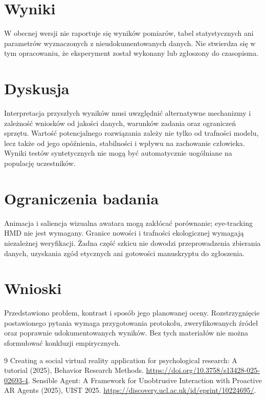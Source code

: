 \documentclass[11pt,a4paper]{article}
\begin{document}
\section{Wyniki}

W obecnej wersji nie raportuje się wyników pomiarów, tabel statystycznych ani parametrów wyznaczonych z nieudokumentowanych danych. Nie stwierdza się w tym opracowaniu, że eksperyment został wykonany lub zgłoszony do czasopisma.

\section{Dyskusja}

Interpretacja przyszłych wyników musi uwzględnić alternatywne mechanizmy i zależność wniosków od jakości danych, warunków zadania oraz ograniczeń sprzętu. Wartość potencjalnego rozwiązania zależy nie tylko od trafności modelu, lecz także od jego opóźnienia, stabilności i wpływu na zachowanie człowieka. Wyniki testów syntetycznych nie mogą być automatycznie uogólniane na populację uczestników.

\section{Ograniczenia badania}

Animacja i saliencja wizualna awatara mogą zakłócać porównanie; eye-tracking HMD nie jest wymagany. Granice nowości i trafności ekologicznej wymagają niezależnej weryfikacji. Żadna część szkicu nie dowodzi przeprowadzenia zbierania danych, uzyskania zgód etycznych ani gotowości manuskryptu do zgłoszenia.

\section{Wnioski}

Przedstawiono problem, kontrast i sposób jego planowanej oceny. Rozstrzygnięcie postawionego pytania wymaga przygotowania protokołu, zweryfikowanych źródeł oraz poprawnie udokumentowanych wyników. Bez tych materiałów nie można sformułować konkluzji empirycznych.

\begin{thebibliography}{9}
 Creating a social virtual reality application for psychological research: A tutorial (2025), Behavior Research Methods. \url{https://doi.org/10.3758/s13428-025-02693-4}.
 Sensible Agent: A Framework for Unobtrusive Interaction with Proactive AR Agents (2025), UIST 2025. \url{https://discovery.ucl.ac.uk/id/eprint/10224695/}.
\end{thebibliography}
\end{document}
